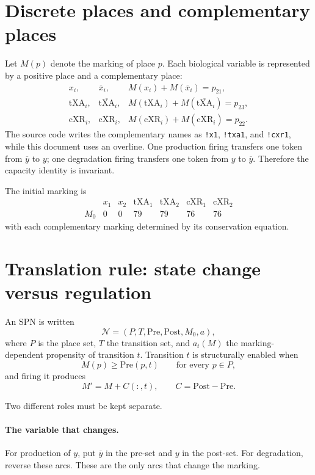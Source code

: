 \documentclass[11pt,a4paper]{article}
\newcommand{\txa}{\mathrm{tXA}}
\newcommand{\cxr}{\mathrm{cXR}}
\newcommand{\Pre}{\mathrm{Pre}}
\newcommand{\Post}{\mathrm{Post}}
\begin{document}
\section{Discrete places and complementary places}

Let $M(p)$ denote the marking of place $p$.  Each biological variable is
represented by a positive place and a complementary place:
\[
\begin{array}{lll}
 x_i, & \overline{x}_i, & M(x_i)+M(\overline{x}_i)=p_{21},\\
 \txa_i, & \overline{\txa}_i, &
 M(\txa_i)+M(\overline{\txa}_i)=p_{23},\\
 \cxr_i, & \overline{\cxr}_i, &
 M(\cxr_i)+M(\overline{\cxr}_i)=p_{22}.
\end{array}
\]
The source code writes the complementary names as \texttt{!x1},
\texttt{!txa1}, and \texttt{!cxr1}, while this document uses an overline.
One production firing transfers one token from $\overline y$ to $y$; one
degradation firing transfers one token from $y$ to $\overline y$.  Therefore
the capacity identity is invariant.

The initial marking is
\[
\begin{array}{c|cccccc}
 &x_1&x_2&\txa_1&\txa_2&\cxr_1&\cxr_2\\ \hline
M_0&0&0&79&79&76&76
\end{array}
\]
with each complementary marking determined by its conservation equation.

\section{Translation rule: state change versus regulation}

An SPN is written
\[
  \mathcal N=(P,T,\Pre,\Post,M_0,a),
\]
where $P$ is the place set, $T$ the transition set, and
$a_t(M)$ the marking-dependent propensity of transition $t$.  Transition $t$
is structurally enabled when
\[
  M(p)\geq \Pre(p,t)\qquad\text{for every }p\in P,
\]
and firing it produces
\[
  M'=M+C(:,t),\qquad C=\Post-\Pre.
\]

Two different roles must be kept separate.

\paragraph{The variable that changes.}
For production of $y$, put $\overline y$ in the pre-set and $y$ in the
post-set.  For degradation, reverse these arcs.  These are the only arcs that
change the marking.
\end{document}
